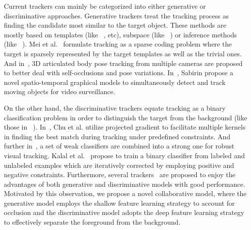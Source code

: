 \documentclass[preprint,12pt,review]{elsarticle}
\begin{document}
Current trackers can mainly be categorized into either generative or discriminative approaches.
%
Generative trackers treat the tracking process as finding the candidate most similar to the target object.
These methods are mostly based on templates (like ~\cite{barnard2014robust, adam2006Frag, jia2012visual, meixue_L1_2009, zhuang2014visual, zhang2013gpu, suau2012real}, etc), subspace (like ~\cite{wang2013online, ross2008incremental}) or inference methods (like ~\cite{xie2013tracking, sabirin2012moving}).
%
%
%
Mei et al.~\cite{meixue_L1_2009} formulate tracking as a sparse coding problem where the target is sparsely represented by the target templates as well as the trivial ones.
%
And in~\cite{zhang2013gpu}, 3D articulated body pose tracking from multiple cameras are proposed to better deal with self-occlusions and pose variations.
%
In~\cite{sabirin2012moving}, Sabirin propose a novel spatio-temporal graphical models to simultaneously detect and track moving objects for video surveillance.



On the other hand, the discriminative trackers equate tracking as a binary classification problem in order to distinguish the target from the background (like those in ~\cite{avidan2007ensemble, kalal2010pn, babenko2009visual, grabner2008semi, chu2013tracking}).
%
In~\cite{chu2013tracking}, Chu et al. utilize projected gradient to facilitate multiple kernels in finding the best match during tracking under predefined constraints.
%
And further in~\cite{avidan2007ensemble}, a set of weak classifiers are combined into a strong one for robust visual tracking.
%
Kalal et al.~\cite{kalal2010pn} propose to train a binary classifier from labeled and unlabeled examples which are iteratively corrected by employing positive and negative constraints.
%
Furthermore, several trackers~\cite{zhong2012robust, yu2008online, liu2009robust, dinh2011co} are proposed to enjoy the advantages of both generative and discriminative models with good performance.
%
Motivated by this observation, we propose a novel collaborative model, where the generative model employs the shallow feature learning strategy to account for occlusion and the discriminative model adopts the deep feature learning strategy to effectively separate the foreground from the background.
\end{document}

